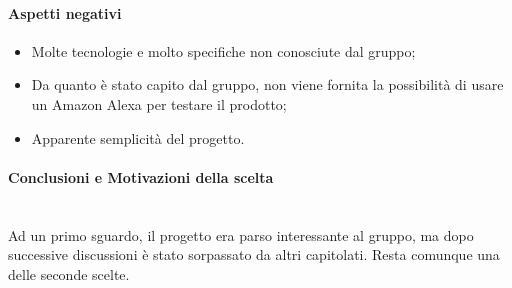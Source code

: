 \paragraph{Aspetti negativi}
\begin{itemize}
	\item Molte tecnologie e molto specifiche non conosciute dal gruppo;
	\item Da quanto è stato capito dal gruppo, non viene fornita la possibilità di usare un Amazon Alexa per testare il prodotto;
	\item Apparente semplicità del progetto.
\end{itemize}

\paragraph{Conclusioni e Motivazioni della scelta}\-\\
Ad un primo sguardo, il progetto era parso interessante al gruppo, ma dopo successive discussioni è stato sorpassato da altri capitolati. Resta comunque una delle seconde scelte.